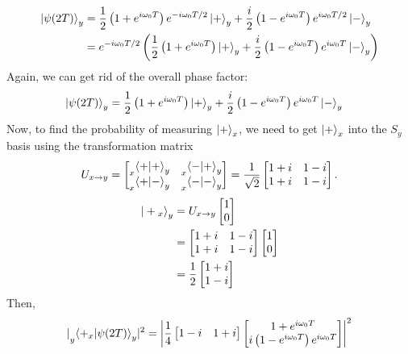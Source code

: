 \documentclass[11pt]{article}
\DeclarePairedDelimiter\abs{\lvert}{\rvert}
\begin{document}
\begin{enumerate}[label=\textbf{\arabic*.}]
{\begin{enumerate}[label=\textbf{(\alph*)}]
{\begin{align*}
                        \ket{\psi(2T)}_y&=\frac 1 2\left(1+e^{i\omega_0T}\right)e^{-i\omega_0T/2}\ket{+}_y+\frac i 2\left(1-e^{i\omega_0T}\right)e^{i\omega_0T/2}\ket{-}_y \\
                        &=e^{-i\omega_0T/2}\left(\frac 1 2\left(1+e^{i\omega_0T}\right)\ket{+}_y+\frac i 2\left(1-e^{i\omega_0T}\right)e^{i\omega_0T}\ket{-}_y\right)
                    \end{align*}
                    Again, we can get rid of the overall phase factor:
                    \begin{align*}
                        \ket{\psi(2T)}_y&=\frac 1 2\left(1+e^{i\omega_0T}\right)\ket{+}_y+\frac i 2\left(1-e^{i\omega_0T}\right)e^{i\omega_0T}\ket{-}_y
                    \end{align*}
                    Now, to find the probability of measuring \(\ket{+}_x\), we need to get \(\ket{+}_x\) into the \(S_y\) basis using the transformation matrix
                    \[U_{x\rightarrow y}=\begin{bmatrix}\prescript{}{x}{\braket{+|+}_y} & \prescript{}{x}{\braket{-|+}_y} \\ \prescript{}{x}{\braket{+|-}_y} & \prescript{}{x}{\braket{-|-}_y}\end{bmatrix}=\frac{1}{\sqrt 2}\begin{bmatrix}1+i & 1-i \\ 1+i & 1-i\end{bmatrix}.\]
                    \begin{align*}
                        \ket{{}+{}_x}_y&=U_{x\rightarrow y}\begin{bmatrix}1 \\ 0\end{bmatrix} \\
                        &=\begin{bmatrix}1+i & 1-i \\ 1+i & 1-i\end{bmatrix}\begin{bmatrix}1 \\ 0\end{bmatrix} \\
                        &=\frac 1 2\begin{bmatrix}1+i \\ 1-i\end{bmatrix}
                    \end{align*}
                    Then,
                    \begin{align*}
                        \abs{\prescript{}{y}{\braket{+_x|\psi(2T)}_y}}^2&=\abs*{\frac 1 4\begin{bmatrix}1-i & 1+i\end{bmatrix}\begin{bmatrix}1+e^{i\omega_0T} \\ i\left(1-e^{i\omega_0T}\right)e^{i\omega_0T}\end{bmatrix}}^2 \\

\end{align*}}
\end{enumerate}}
\end{enumerate}
\end{document}
